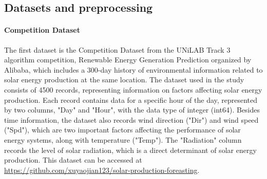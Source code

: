 \documentclass[sn-mathphys-num]{sn-jnl}%
\begin{document}
\subsection{Datasets and preprocessing}
\paragraph{Competition Dataset}The first dataset is the Competition Dataset from the UNiLAB Track 3 algorithm competition, Renewable Energy Generation Prediction organized by Alibaba, which includes a 300-day history of environmental information related to solar energy production at the same location. The dataset used in the study consists of 4500 records, representing information on factors affecting solar energy production. Each record contains data for a specific hour of the day, represented by two columns, "Day" and "Hour", with the data type of integer (int64). Besides time information, the dataset also records wind direction ("Dir") and wind speed ("Spd"), which are two important factors affecting the performance of solar energy systems, along with temperature ("Temp"). The "Radiation" column records the level of solar radiation, which is a direct determinant of solar energy production. This dataset can be accessed at \href{https://github.com/xuyaojian123/solar-production-foreasting}{https://github.com/xuyaojian123/solar-production-foreasting}.
\end{document}
